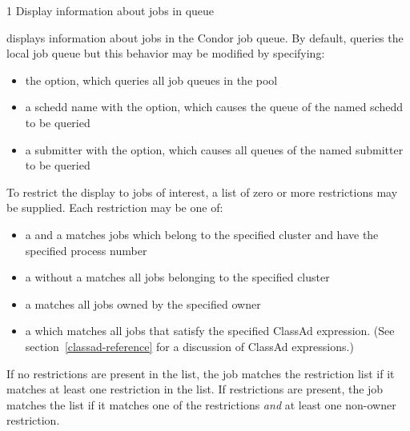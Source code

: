 \begin{ManPage}{\label{man-condor-q}}{1}
{Display information about jobs in queue}
\Synopsis {}


\Description
{} displays information about jobs in the Condor job queue.  By
default,  queries the local job queue but this behavior may be 
modified by specifying:
\begin{itemize}
	\item the  option, which queries all job queues in the pool
	\item a schedd name with the  option, which causes the queue of 
		the named schedd to be queried 
	\item a submitter with the  option, which causes all queues
		of the named submitter to be queried
\end{itemize}

To restrict the display to jobs of interest, a list of zero or more 
restrictions may be supplied.  Each restriction may be one of:
\begin{itemize}
	\item a  and a  matches jobs which
		belong to the specified cluster and have the specified process number
	\item a  without a  matches all jobs belonging
		to the specified cluster
	\item a  matches all jobs owned by the specified owner
	\item a  which matches all jobs that
		satisfy the specified ClassAd expression. (See section~\ref{classad-reference}
		for a discussion of ClassAd expressions.)
\end{itemize}
If no  restrictions are present in the list, the job matches the 
restriction list if it matches at least one restriction in the list.  If 
 restrictions are present, the job matches the list if it matches 
one of the  restrictions \emph{and} at least one non-owner 
restriction.


\end{ManPage}

